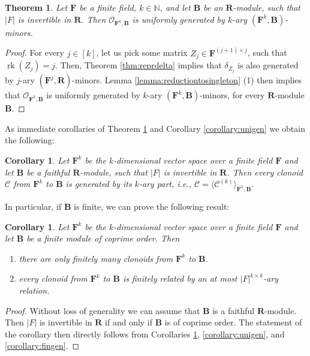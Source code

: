 \documentclass[11pt]{amsart}
\theoremstyle{plain}
\newtheorem{theorem}[thm]{Theorem}
\newtheorem{corollary}[thm]{Corollary}
\theoremstyle{definition}
\newcommand{\N}{{\mathbb N}}
\newcommand{\F}{{\mathbf F}}
\newcommand{\alg}[1]{\mathbf{#1}}
\newcommand{\clonoid}[1]{\mathcal{#1}}
\newcommand{\clodC}{\clonoid{C}}
\newcommand{\clodO}{\clonoid{O}}
\newcommand{\algB}{\alg{B}}
\newcommand{\algR}{\alg{R}}
\DeclareMathOperator{\rk}{rk}
\begin{document}
\begin{theorem} \label{theorem:main}
Let $\F$ be a finite field, $k \in \N$, and let $\algB$ be an $\algR$-module, such that $|F|$ is invertible in $\algR$. Then $\clodO_{\F^k,\algB}$ is uniformly generated by $k$-ary $(\F^k,\algB)$-minors.
\end{theorem}

\begin{proof}
For every $j\in[k]$, let us pick some matrix $Z_j \in \F^{(j+1)\times j}$, such that $\rk(Z_j) = j$. Then, Theorem \ref{thm:reprdelta} implies that $\delta_{Z_j}$ is also generated by $j$-ary $(\F^j,\algR)$-minors. Lemma \ref{lemma:reductiontosingleton} (1) then implies that $\clodO_{\F^k,\algB}$ is uniformly generated by $k$-ary $(\F^k,\algB)$-minors, for every $\algR$-module $\algB$.
\end{proof}

As immediate corollaries of Theorem \ref{theorem:main} and Corollary \ref{corollary:unigen} we obtain the following:

\begin{corollary} \label{corollary:main}
Let $\F^k$ be the $k$-dimensional vector space over a finite field $\F$ and let $\algB$ be a faithful $\algR$-module, such that $|F|$ is invertible in $\algR$. Then every clonoid $\clodC$ from $\F^k$ to $\algB$ is generated by its $k$-ary part, i.e., $\clodC = \langle \clodC^{(k)}\rangle_{\F^k, \algB}$.
\end{corollary}

In particular, if $\algB$ is finite, we can prove the following result:

\begin{corollary} \label{corollary:main2}
Let $\F^k$ be the $k$-dimensional vector space over a finite field $\F$ and let $\algB$ be a finite module of coprime order. Then
\begin{enumerate}
\item there are only finitely many clonoids from $\F^k$ to $\algB$.
\item every clonoid from $\F^k$ to $\algB$ is finitely related by an at most $|F|^{k\times k}$-ary relation.
\end{enumerate}
\end{corollary}

\begin{proof}
Without loss of generality we can assume that $\algB$ is a faithful $\algR$-module. Then $|F|$ is invertible in $\algR$ if and only if $\algB$ is of coprime order.
The statement of the corollary then directly follows from Corollaries \ref{corollary:main}, \ref{corollary:unigen}, and \ref{corollary:fingen}.
\end{proof}
\end{document}
